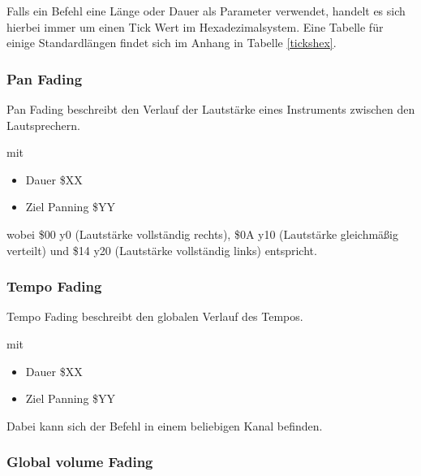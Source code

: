\bigskip

Falls ein Befehl eine Länge oder Dauer als Parameter verwendet, handelt es sich hierbei immer um einen Tick Wert im Hexadezimalsystem. Eine Tabelle für einige Standardlängen findet sich im Anhang in Tabelle \ref{tickshex}.

\subsubsection{Pan Fading}

Pan Fading beschreibt den Verlauf der Lautstärke eines Instruments zwischen den Lautsprechern.

\medskip



\medskip

mit 

\begin{itemize}
	\item Dauer \$XX 
	\item Ziel Panning \$YY
\end{itemize}

wobei \$00 y0 (Lautstärke vollständig rechts), \$0A y10 (Lautstärke gleichmäßig verteilt) und \$14 y20 (Lautstärke vollständig links) entspricht.

\subsubsection{Tempo Fading}

Tempo Fading beschreibt den globalen Verlauf des Tempos.

\medskip



\medskip

mit 

\begin{itemize}
	\item Dauer \$XX 
	\item Ziel Panning \$YY
\end{itemize}

Dabei kann sich der Befehl in einem beliebigen Kanal befinden.

\subsubsection{Global volume Fading}

